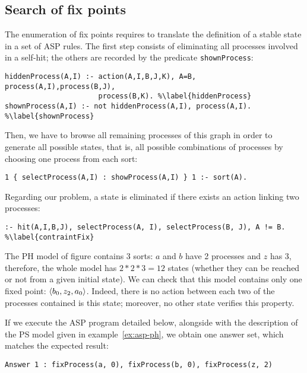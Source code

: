 \subsection{Search of fix points}

The enumeration of fix points requires to translate the definition of a stable state
in a set of ASP rules.
The first step consists of eliminating all processes involved in a self-hit;
the others are recorded by the predicate \texttt{shownProcess}:
\begin{lstlisting}
hiddenProcess(A,I) :- action(A,I,B,J,K), A=B, process(A,I),process(B,J),
                      process(B,K). %\label{hiddenProcess}
shownProcess(A,I) :- not hiddenProcess(A,I), process(A,I). %\label{shownProcess}
\end{lstlisting}
Then, we have to browse all remaining processes of this graph
in order to generate all possible states,
that is, all possible combinations of processes by choosing one process from each sort:
\begin{lstlisting}
1 { selectProcess(A,I) : showProcess(A,I) } 1 :- sort(A).
\end{lstlisting}
%
Regarding our problem, a state is eliminated if there exists an action linking two processes:
\begin{lstlisting}
:- hit(A,I,B,J), selectProcess(A, I), selectProcess(B, J), A != B. %\label{contraintFix}
\end{lstlisting}

\begin{example}
The PH model of figure  contains 3 sorts:
$a$ and $b$ have 2 processes and $z$ has 3, therefore, the whole model has $2*2*3 = 12$ states (whether they can be reached or not from a given initial state).
We can check that this model contains only one fixed point: $\langle b_0, z_2, a_0 \rangle$.
Indeed, there is no action between each two of the processes contained is this state;
moreover, no other state verifies this property.

If we execute the ASP program detailed below,
alongside with the description of the PS model given in example~\ref{ex:asp-ph},
we obtain one answer set, which matches the expected result:
\begin{lstlisting}[numbers=none]
Answer 1 : fixProcess(a, 0), fixProcess(b, 0), fixProcess(z, 2)
\end{lstlisting}
\end{example}